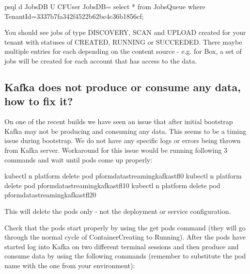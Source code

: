 \documentclass[letterpaper,10pt,english]{sphinxmanual}
\begin{document}
\begin{sphinxVerbatim}[commandchars=\\\{\}]
\PYGZdl{} psql \PYGZhy{}d JobsDB \PYGZhy{}U CFUser
JobsDB=\PYGZgt{} select * from \PYGZdq{}JobsQueue\PYGZdq{} where \PYGZdq{}TenantId\PYGZdq{}=\PYGZsq{}3337b7fa\PYGZhy{}342f\PYGZhy{}4522\PYGZhy{}b62b\PYGZhy{}e4c36b1856cf\PYGZsq{};
\end{sphinxVerbatim}

You should see jobs of type DISCOVERY, SCAN and UPLOAD created for your tenant with statuses of CREATED, RUNNING or SUCCEEDED. There maybe multiple entries for each depending on the content source - e.g. for Box, a set of jobs will be created for each account that has access to the data.


\subsection{Kafka does not produce or consume any data, how to fix it?}
\label{\detokenize{loom_installation_guide:kafka-does-not-produce-or-consume-any-data-how-to-fix-it}}
On one of the recent builds we have seen an issue that after initial bootstrap Kafka may not be producing and consuming any data. This seems to be a timing issue during bootstrap. We do not have any specific logs or errors being thrown from Kafka server. Workaround for this issue would be running following 3 commands and wait until pods come up properly:

\begin{sphinxVerbatim}[commandchars=\\\{\}]
\PYGZdl{} kubectl \PYGZhy{}n platform delete pod pform\PYGZhy{}data\PYGZhy{}streaming\PYGZhy{}kafka\PYGZhy{}stfl\PYGZhy{}0
\PYGZdl{} kubectl \PYGZhy{}n platform delete pod pform\PYGZhy{}data\PYGZhy{}streaming\PYGZhy{}kafka\PYGZhy{}stfl\PYGZhy{}1\PYGZhy{}0
\PYGZdl{} kubectl \PYGZhy{}n platform delete pod pform\PYGZhy{}data\PYGZhy{}streaming\PYGZhy{}kafka\PYGZhy{}stfl\PYGZhy{}2\PYGZhy{}0
\end{sphinxVerbatim}

This will delete the pods only - not the deployment or service configuration.

Check that the pods start properly by using the get pods command (they will go through the normal cycle of ContainerCreating to Running).
After the pods have started log into Kafka on two different terminal sessions and then produce and consume data by using the following commands (remember to substitute the pod name with the one from your environment):
\end{document}
